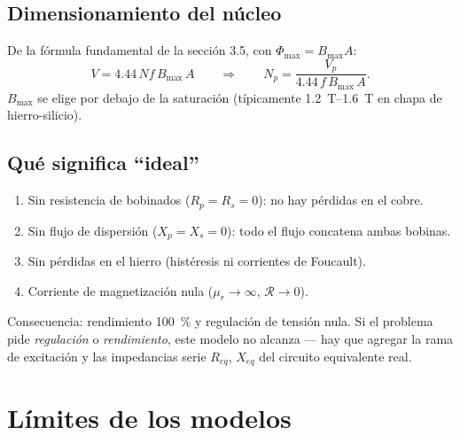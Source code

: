 \documentclass[11pt,a4paper]{article}
\newcommand{\mur}{\mu_r}
\newcommand{\Rel}{\mathcal{R}}          %
\begin{document}
\subsection{Dimensionamiento del núcleo}

De la fórmula fundamental de la sección 3.5, con $\Phi_{\max} = B_{\max} A$:
\begin{equation}
  V = 4.44\,N f\,B_{\max}\,A
  \qquad\Longrightarrow\qquad
  N_p = \frac{V_p}{4.44\,f\,B_{\max}\,A} .
\end{equation}
$B_{\max}$ se elige por debajo de la saturación (típicamente \qtyrange{1.2}{1.6}{\tesla} en
chapa de hierro-silicio).

\subsection{Qué significa ``ideal''}

\begin{enumerate}[nosep,leftmargin=*]
  \item Sin resistencia de bobinados ($R_p = R_s = 0$): no hay pérdidas en el cobre.
  \item Sin flujo de dispersión ($X_p = X_s = 0$): todo el flujo concatena ambas bobinas.
  \item Sin pérdidas en el hierro (histéresis ni corrientes de Foucault).
  \item Corriente de magnetización nula ($\mur \to \infty$, $\Rel \to 0$).
\end{enumerate}

\noindent Consecuencia: rendimiento \qty{100}{\percent} y regulación de tensión nula. Si el
problema pide \emph{regulación} o \emph{rendimiento}, este modelo no alcanza — hay que
agregar la rama de excitación y las impedancias serie $R_{eq}$, $X_{eq}$ del circuito
equivalente real.

\section{Límites de los modelos}
\end{document}
